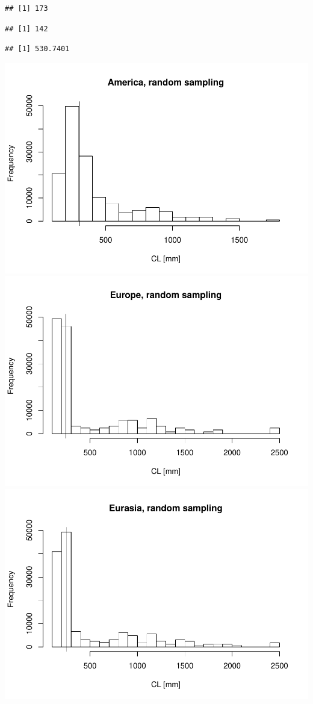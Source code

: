 \documentclass[]{article}
\begin{document}
\begin{verbatim}
## [1] 173
\end{verbatim}

\begin{verbatim}
## [1] 142
\end{verbatim}

\begin{verbatim}
## [1] 530.7401
\end{verbatim}

\includegraphics{MA_JJ_files/figure-latex/RSCon-1.pdf}
\includegraphics{MA_JJ_files/figure-latex/RSCon-2.pdf}
\includegraphics{MA_JJ_files/figure-latex/RSCon-3.pdf}
\end{document}
